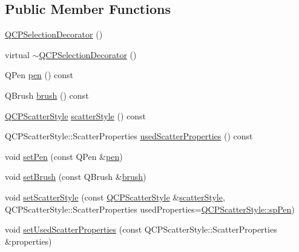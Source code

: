 \subsection*{Public Member Functions}
\begin{DoxyCompactItemize}
\item 
\hyperlink{class_q_c_p_selection_decorator_aa145480d9a062cd176fe30900bb7bca8}{Q\+C\+P\+Selection\+Decorator} ()
\item 
virtual \hyperlink{class_q_c_p_selection_decorator_ab211eb11379854dcbe23b1642be0d19e}{$\sim$\+Q\+C\+P\+Selection\+Decorator} ()
\item 
Q\+Pen \hyperlink{class_q_c_p_selection_decorator_a9307a60c9759223367909aed2d05ad91}{pen} () const
\item 
Q\+Brush \hyperlink{class_q_c_p_selection_decorator_a783b643aa52120a25308fc501b9998b1}{brush} () const
\item 
\hyperlink{class_q_c_p_scatter_style}{Q\+C\+P\+Scatter\+Style} \hyperlink{class_q_c_p_selection_decorator_aa6558f6f270a188bb633386aba0d1ae4}{scatter\+Style} () const
\item 
Q\+C\+P\+Scatter\+Style\+::\+Scatter\+Properties \hyperlink{class_q_c_p_selection_decorator_ab2019bf31dde39f1ec028e3810dfc08b}{used\+Scatter\+Properties} () const
\item 
void \hyperlink{class_q_c_p_selection_decorator_ac2c8192e1e294aa3a4a7f32a859e3d76}{set\+Pen} (const Q\+Pen \&\hyperlink{class_q_c_p_selection_decorator_a9307a60c9759223367909aed2d05ad91}{pen})
\item 
void \hyperlink{class_q_c_p_selection_decorator_aa74b626be518ea17055f918d423c8c2d}{set\+Brush} (const Q\+Brush \&\hyperlink{class_q_c_p_selection_decorator_a783b643aa52120a25308fc501b9998b1}{brush})
\item 
void \hyperlink{class_q_c_p_selection_decorator_ab403a613289714ff4fd4a0c0371ab116}{set\+Scatter\+Style} (const \hyperlink{class_q_c_p_scatter_style}{Q\+C\+P\+Scatter\+Style} \&\hyperlink{class_q_c_p_selection_decorator_aa6558f6f270a188bb633386aba0d1ae4}{scatter\+Style}, Q\+C\+P\+Scatter\+Style\+::\+Scatter\+Properties used\+Properties=\hyperlink{class_q_c_p_scatter_style_a8974f6a20f8f6eea7781f0e6af9deb46aa04d012e7c03e455db2b68fdd55c2a04}{Q\+C\+P\+Scatter\+Style\+::sp\+Pen})
\item 
void \hyperlink{class_q_c_p_selection_decorator_a808c1607cd4e83869c04986e332455c0}{set\+Used\+Scatter\+Properties} (const Q\+C\+P\+Scatter\+Style\+::\+Scatter\+Properties \&properties)
\item 

\end{DoxyCompactItemize}
